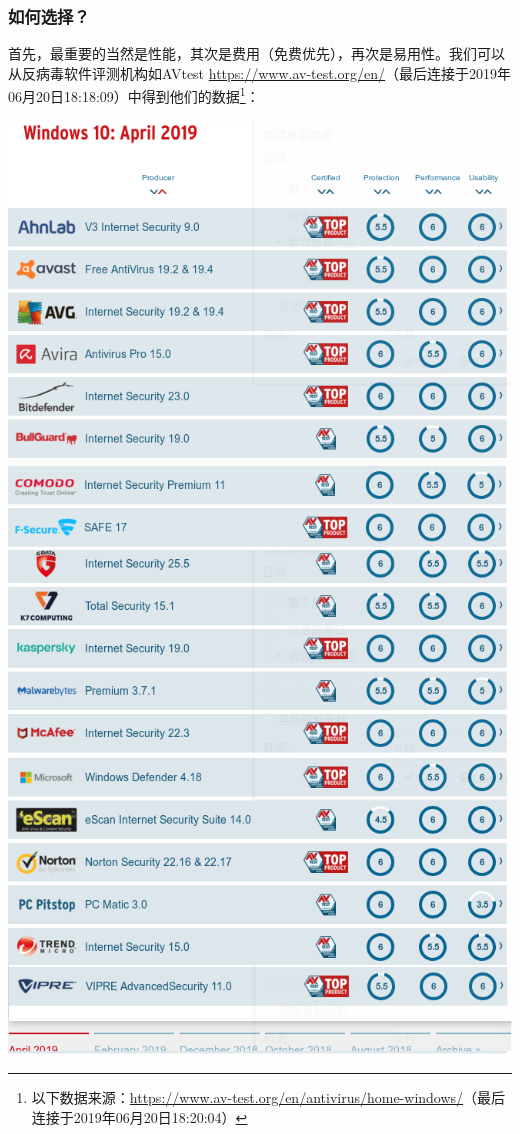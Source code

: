 \subsubsection{如何选择？}
首先，最重要的当然是性能，其次是费用（免费优先），再次是易用性。我们可以从反病毒软件评测机构如AVtest \url{https://www.av-test.org/en/}（最后连接于2019年06月20日18:18:09）中得到他们的数据\footnote{以下数据来源：\url{https://www.av-test.org/en/antivirus/home-windows/}（最后连接于2019年06月20日18:20:04）}：
\begin{center}
\includegraphics[scale=0.5]{pic/avtest1}\includegraphics[scale=0.5]{pic/avtest2}
\includegraphics[scale=0.5]{pic/avtest3}
\end{center} \par
